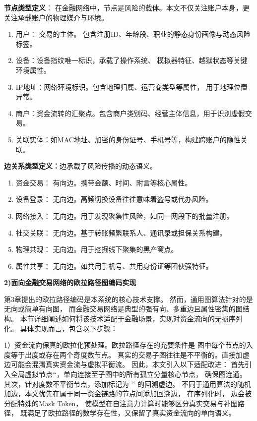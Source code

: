 \textbf{节点类型定义}： 在金融网络中，节点是风险的载体。本文不仅关注账户本身，更关注承载账户的物理媒介与环境。

\begin{enumerate}
    \item 用户： 交易的主体。
    包含注册ID、年龄段、职业的静态身份画像与动态风险标签。

    \item 设备：设备指纹唯一标识，承载了操作系统、
    模拟器特征、越狱状态等关键环境属性。

    \item IP地址：网络环境标识。包含地理归属、运营商类型等属性，
    用于地理位置异常。

    \item 商户：资金流转的汇聚点。包含商户类别码、经营主体信息，用于识别虚假交易。

    \item 关联实体：如MAC地址、加密的身份证号、手机号等，构建跨账户的隐性关联。
\end{enumerate}

\textbf{边关系类型定义：}边承载了风险传播的动态语义。

\begin{enumerate}
    \item 资金交易： 有向边。携带金额、时间、附言等核心属性。

    \item 设备登录： 无向边。高频切换设备往往意味着盗号或代办风险。

    \item 网络接入： 无向边。用于发现聚集性风险，如同一网段下的批量注册。

    \item 社交关联： 无向边。基于转账频繁联系人、通讯录或担保关系构建。

    \item 物理共现： 无向边。用于挖掘线下聚集的黑产窝点。
    \item 属性共享： 无向边。如共用手机号、共用身份证等团伙强特征。
\end{enumerate}



\textbf{2)面向金融交易网络的欧拉路径图编码实现}

第3章提出的欧拉路径编码是本系统的核心技术支撑。
然而，通用图算法针对的是无向或简单有向图，
而金融交易网络是典型的强有向、多重边且属性密集的图结构。
本节详细阐述如何将该技术适配于金融场景，实现对资金流向的无损序列化。
具体实现而言，包含以下步骤：

 {1）资金流向保真的欧拉化预处理。}欧拉路径存在的充要条件是
图中每个节点的入度等于出度或存在两个奇度数节点。
真实的交易子图往往是不平衡的。直接加虚边可能会混淆真实资金流与虚拟平衡流。
因此，本文引入以下适配改进：
首先引入全局虚拟节点$``$，单向连接至子图中的所有孤立分量核心节点，
确保图连通。
其次，针对度数不平衡节点，添加标记为 $``$ 的回溯虚边。
不同于通用算法的随机加边，本文优先在属于同一资金链路的节点间添加回溯边，
在序列化时， 边会被分配特殊的Mask Token，
使模型在自注意力计算时能够区分真实交易与补图路径，
既满足了欧拉路径的数学存在性，又保留了真实资金流向的单向语义。

